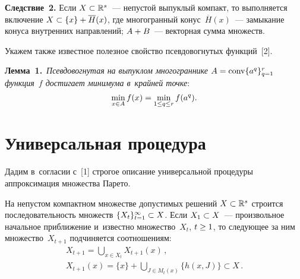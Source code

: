 \begin{multicols}{2}
\smallskip

\noindent
\textbf{Следствие~2.} Если $X\hm\subset \mathbb{R}^s$~--- непустой 
выпуклый компакт, то выполняется включение $X\hm\subset \{x\}\hm+ 
\overline{H}(x)$, где многогранный конус~$\overline{H}(x)$~--- замыкание 
конуса внутренних направлений; $A\hm+B$~--- векторная сумма множеств.

  Укажем также известное полезное свойство псевдовогнутых функций~[2].
  
  \smallskip
  \noindent
  \textbf{Лемма~1.}\ \textit{Псевдовогнутая на выпуклом многограннике 
$A\hm= \mathrm{conv} \{a^q\}^r_{q=1}$ функция~$f$ достигает минимума в~крайней 
точке}:
$$
\min\limits_{x\in A} f(x)\hm= \min\limits_{1\leq q\leq r} f(a^q).
$$

\vspace*{-14pt}
   
\section{Универсальная процедура}

\vspace*{-3pt}

  Дадим в~согласии с~[1] строгое описание универсальной процедуры 
аппроксимация множества Парето.
  
  На непустом компактном множестве допустимых решений $X\hm\subset 
\mathbb{R}^s$ строится последовательность множеств 
$\{X_t\}^\infty_{t=1}\hm\subset X$. Если $X_1\hm\subset X$~--- произвольное 
начальное приближение и~известно множество~$X_t$, $t\hm\geq 1$, то 
следующее за ним множество~$X_{t+1}$ подчиняется соотношениям:
  \begin{multline}
  X_{t+1} =\bigcup\limits_{x\in X_t} X_{t+1}(x)\,,\\
  X_{t+1}(x)=\{x\} +\bigcup\limits_{J\in M_t(x)} \{ h(x,J)\} \subset X\,.
   \label{e6-r}
  \end{multline}
  

\end{multicols}
